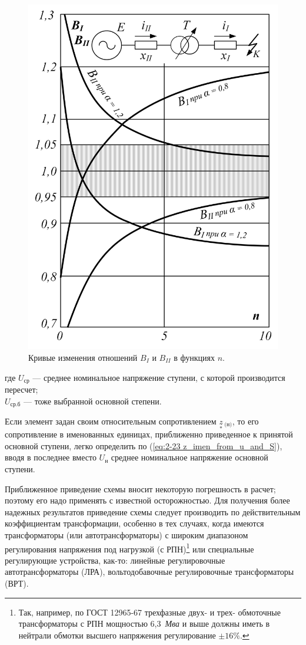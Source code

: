 \begin{figure} %
	\centering
	\includegraphics[width=0.95\linewidth]{pic/2-2}
	\caption{Кривые изменения отношений $ B_I $ и $ B_{II} $ в функциях $ n $.}
	\label{ris:2-2 B_I and B_I}
\end{figure}

где $ U_{\text{ср}} $ --- среднее номинальное напряжение ступени, с которой производится пересчет;\\
$ U_{\text{ср.б}} $ --- тоже выбранной основной степени.

Если элемент задан своим относительным сопротивлением $ \underset{*}{z}\!\,_{\text{(н)}} $, то его сопротивление в именованных единицах, приближенно приведенное к принятой основной ступени, легко определить по (\ref{eq:2-23 z_imen_from_u_and_S}), вводя в последнее вместо $ U_{\text{н}} $ среднее номинальное напряжение основной ступени.

Приближенное приведение схемы вносит некоторую погрешность в расчет; поэтому его надо применять с известной осторожностью. Для получения более надежных результатов приведение схемы следует производить по действительным коэффициентам трансформации, особенно в тех случаях, когда имеются трансформаторы (или автотрансформаторы) с широким диапазоном регулирования напряжения под нагрузкой (с РПН)\footnote{Так, например, по ГОСТ 12965-67 трехфазные двух- и трех- обмоточные трансформаторы с РПН мощностью 6,3~\textit{Мва} и выше должны иметь в нейтрали обмотки высшего напряжения регулирование $ \pm16\% $.} или специальные регулирующие устройства, как-то: линейные регулировочные автотрансформаторы (ЛРА), вольтодобавочные регулировочные трансформаторы (ВРТ).


